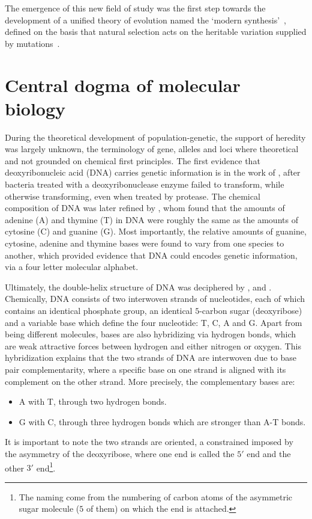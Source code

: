 The emergence of this new field of study was the first step towards the development of a unified theory of evolution named the ‘modern synthesis’~\citep{huxley1942evolution}, defined on the basis that natural selection acts on the heritable variation supplied by mutations~\citep{mayr1959where,stebbins1966processes,dobzhansky1974chance}.

\section{Central dogma of molecular biology}
During the theoretical development of population-genetic, the support of heredity was largely unknown, the terminology of gene, \glspl{allele} and loci where theoretical and not grounded on chemical first principles.
The first evidence that deoxyribonucleic acid (\acrshort{DNA}) carries genetic information is in the work of \citet{Avery1944}, after bacteria treated with a deoxyribonuclease enzyme failed to transform, while otherwise transforming, even when treated by protease.
The chemical composition of \acrshort{DNA} was later refined by \citet{Chargaff1950}, whom found that the amounts of adenine (A) and thymine (T) in \acrshort{DNA} were roughly the same as the amounts of cytosine (C) and guanine (G).
Most importantly, the relative amounts of guanine, cytosine, adenine and thymine bases were found to vary from one species to another, which provided evidence that \acrshort{DNA} could encodes genetic information, via a four letter molecular alphabet.

Ultimately, the double-helix structure of \acrshort{DNA} was deciphered by \citet{franklin1953molecular}, \citet{watson1953molecular} and \citet{wilkins1953molecular}.
Chemically, \acrshort{DNA} consists of two interwoven strands of nucleotides, each of which contains an identical phosphate group, an identical $5$-carbon sugar (deoxyribose) and a variable base which define the four nucleotide: T, C, A and G.
Apart from being different molecules, bases are also hybridizing via hydrogen bonds, which are weak attractive forces between hydrogen and either nitrogen or oxygen.
This hybridization explains that the two strands of \acrshort{DNA} are interwoven due to base pair complementarity, where a specific base on one strand is aligned with its complement on the other strand.
More precisely, the complementary bases are:
\begin{itemize}
	\item A with T, through two hydrogen bonds.
	\item G with C, through three hydrogen bonds which are stronger than A-T bonds.

\end{itemize}
It is important to note the two strands are oriented, a constrained imposed by the asymmetry of the deoxyribose, where one end is called the $5'$ end and the other $3'$ end\footnote{The naming come from the numbering of carbon atoms of the asymmetric sugar molecule ($5$ of them) on which the end is attached.}.

